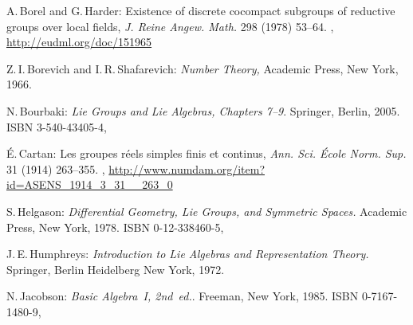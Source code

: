 \begin{references}{99}


 A.\,Borel and G.\,Harder:
 Existence of discrete cocompact subgroups of reductive
groups over local fields,
 \emph{J. Reine Angew. Math.} 298 (1978) 53--64.
 ,
 \maynewline
 \url{http://eudml.org/doc/151965}
 
 Z.\,I.\,Borevich and I.\,R.\,Shafarevich:
 \emph{Number Theory,}
 Academic Press, New York, 1966.

N.\,Bourbaki:
\emph{Lie Groups and Lie Algebras, Chapters 7--9}. 
Springer, Berlin, 2005. 
ISBN 3-540-43405-4,

 \'E.\,Cartan:
 Les groupes r\'eels simples finis et continus,
 \emph{Ann. Sci. \'Ecole Norm. Sup.} 31 (1914) 263--355.
 ,
 \maynewline
 \url{http://www.numdam.org/item?id=ASENS_1914_3_31__263_0}



S.\,Helgason:
\emph{Differential Geometry, Lie Groups, and Symmetric Spaces.}
Academic Press, New York, 1978.
ISBN 0-12-338460-5,

 J.\,E.\,Humphreys:
 \emph{Introduction to Lie Algebras and Representation
Theory.}
 Springer, {Berlin Heidelberg New York}, 1972.

N.\,Jacobson:
\emph{Basic Algebra~I, 2nd~ed.}.
Freeman, New York, 1985. 
ISBN 0-7167-1480-9,


\end{references}
